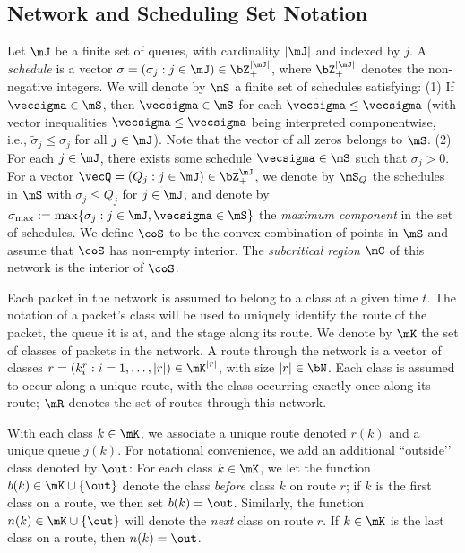 \documentclass{amsart}
\begin{document}
\subsection{Network and Scheduling Set Notation}
\label{subsection2.1}
Let $\mJ$ be a finite set of queues, with cardinality $|\mJ|$ and  indexed by $j$.
A \emph{schedule} is a vector $\sigma=(\sigma_j : j\in\mJ) \in \bZ_+^{|\mJ|}$, where $\bZ_+^{|\mJ|}$ denotes the non-negative integers.  We will denote by
$\mS$ a finite set of schedules satisfying: (1) If $\vecsigma\in\mS$, then
$\tilde{\vecsigma}\in\mS$ for each $\tilde{\vecsigma}\leq\vecsigma$   
(with vector inequalities  $\tilde{\vecsigma}\leq\vecsigma$ being interpreted componentwise, i.e., $\tilde{\sigma}_j \leq \sigma_j$ for all $j\in\mJ$).  Note that
the vector of all zeros belongs to $\mS$.
(2) For each $j\in\mJ$, there exists some schedule $\vecsigma\in\mS$ such that $\sigma_j>0$.    For a vector $\vecQ=(Q_j: j\in\mJ) \in \bZ_+^\mJ$, we denote by $\mS_Q$ the schedules in $\mS$ with $\sigma_j \leq Q_j$ for $j\in\mJ$, and 
denote by $\sigma_{\max}:=\max\{ \sigma_j : j\in\mJ, \vecsigma\in\mS \}$
the \emph{maximum component} in the set of schedules.
We define $\coS$ to be the convex combination of points in $\mS$ and assume that $\coS$ has non-empty interior.
The \emph{subcritical region} $\mC$ of this network is the interior of $\coS$.

Each packet in the network is assumed to belong to a class at a given time $t$. The notation of a packet\rq{}s class will be used to uniquely identify the route of the packet, the queue it is at, and the stage along its route.
We denote by $\mK$ the set of classes of packets in the network.
A route through the network is a vector of classes
$r=(k^r_i : i=1,\ldots,|r|)\in\mK^{|r|}$, with size $|r|\in\bN$. Each class is assumed to occur along a unique route, with the class occurring  exactly once along its route; $\mR$ denotes the set of routes through this network.

With each class $k\in\mK$, we associate a unique route denoted $r(k)$ and a unique queue $j(k)$. For notational convenience, we add an additional ``outside\rq{}\rq{} class denoted by $\out$:  For each class $k\in\mK$, we let the function $b(k) \in\mK \cup \{\out\}$ denote the class \emph{before} class $k$ on route $r$; if $k$ is the first class on a route, we then set $b(k)=\out$. Similarly, the function $n(k) \in\mK \cup \{\out\}$ will denote the \emph{next} class on route $r$. If $k\in\mK$ is the last class on a route, then $n(k)=\out$. 
\end{document}
